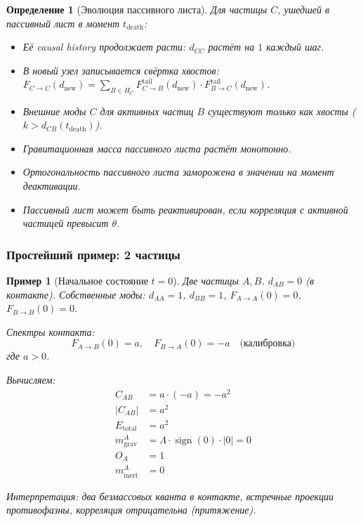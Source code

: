 \documentclass[12pt,a4paper]{article}
\newtheorem{definition}{Определение}[section]
\newtheorem{example}{Пример}[section]
\begin{document}
\begin{definition}[Эволюция пассивного листа]
Для частицы $C$, ушедшей в пассивный лист в момент $t_{\text{death}}$:
\begin{itemize}
    \item Её causal history продолжает расти: $d_{CC}$ растёт на $1$ каждый шаг.
    \item В новый узел записывается свёртка хвостов: $F_{C \to C}(d_{\text{new}}) = \sum_{B \in H_C} F_{C \to B}^{\text{tail}}(d_{\text{new}}) \cdot F_{B \to C}^{\text{tail}}(d_{\text{new}})$.
    \item Внешние моды $C$ для активных частиц $B$ существуют только как хвосты ($k > d_{CB}(t_{\text{death}})$).
    \item Гравитационная масса пассивного листа растёт монотонно.
    \item Ортогональность пассивного листа заморожена в значении на момент деактивации.
    \item Пассивный лист может быть реактивирован, если корреляция с активной частицей превысит $\theta$.
\end{itemize}
\end{definition}

\subsubsection{Простейший пример: 2 частицы}

\begin{example}[Начальное состояние $t=0$]
Две частицы $A, B$. $d_{AB} = 0$ (в контакте).
Собственные моды: $d_{AA} = 1$, $d_{BB} = 1$, $F_{A \to A}(0) = 0$, $F_{B \to B}(0) = 0$.

Спектры контакта:
\begin{equation}
    F_{A \to B}(0) = a, \quad F_{B \to A}(0) = -a \quad \text{(калибровка)}
\end{equation}
где $a > 0$.

Вычисляем:
\begin{align}
    C_{AB} &= a \cdot (-a) = -a^2 \\
    |C_{AB}| &= a^2 \\
    E_{\text{total}} &= a^2 \\
    m_{\text{grav}}^A &= \Lambda \cdot \operatorname{sign}(0) \cdot |0| = 0 \\
    O_A &= 1 \\
    m_{\text{inert}}^A &= 0
\end{align}

Интерпретация: два безмассовых кванта в контакте, встречные проекции противофазны, корреляция отрицательна (притяжение).
\end{example}
\end{document}

